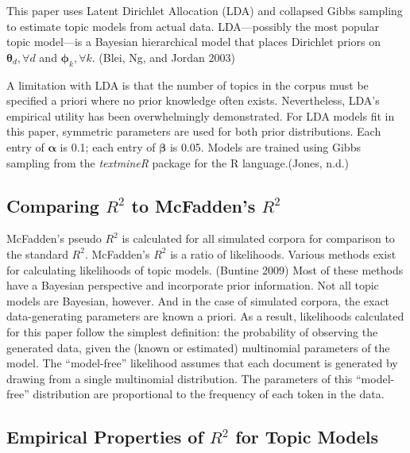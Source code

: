 \documentclass[conference,final,]{IEEEtran}
\begin{document}
This paper uses Latent Dirichlet Allocation (LDA) and collapsed Gibbs
sampling to estimate topic models from actual data. LDA---possibly the
most popular topic model---is a Bayesian hierarchical model that places
Dirichlet priors on \(\boldsymbol\theta_d, \forall d\) and
\(\boldsymbol\phi_k, \forall k\). (Blei, Ng, and Jordan 2003)

A limitation with LDA is that the number of topics in the corpus must be
specified a priori where no prior knowledge often exists. Nevertheless,
LDA's empirical utility has been overwhelmingly demonstrated. For LDA
models fit in this paper, symmetric parameters are used for both prior
distributions. Each entry of \(\boldsymbol\alpha\) is 0.1; each entry of
\(\boldsymbol\beta\) is 0.05. Models are trained using Gibbs sampling
from the \emph{textmineR} package for the R language.(Jones, n.d.)

\hypertarget{comparing-r2-to-mcfaddens-r2}{%
\subsection{\texorpdfstring{Comparing \(R^2\) to McFadden's
\(R^2\)}{Comparing R\^{}2 to McFadden's R\^{}2}}\label{comparing-r2-to-mcfaddens-r2}}

McFadden's pseudo \(R^2\) is calculated for all simulated corpora for
comparison to the standard \(R^2\). McFadden's \(R^2\) is a ratio of
likelihoods. Various methods exist for calculating likelihoods of topic
models. (Buntine 2009) Most of these methods have a Bayesian perspective
and incorporate prior information. Not all topic models are Bayesian,
however. And in the case of simulated corpora, the exact data-generating
parameters are known a priori. As a result, likelihoods calculated for
this paper follow the simplest definition: the probability of observing
the generated data, given the (known or estimated) multinomial
parameters of the model. The ``model-free'' likelihood assumes that each
document is generated by drawing from a single multinomial distribution.
The parameters of this ``model-free'' distribution are proportional to
the frequency of each token in the data.

\hypertarget{empirical-properties-of-r2-for-topic-models}{%
\subsection{\texorpdfstring{Empirical Properties of \(R^2\) for Topic
Models}{Empirical Properties of R\^{}2 for Topic Models}}\label{empirical-properties-of-r2-for-topic-models}}
\end{document}
